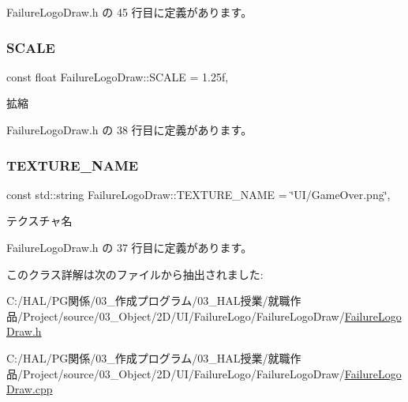  Failure\+Logo\+Draw.\+h の 45 行目に定義があります。

\mbox{\label{class_failure_logo_draw_a356d2f6f14682ad6f2e9a01ffdd587b0}} 
\subsubsection{\texorpdfstring{S\+C\+A\+LE}{SCALE}}
{\footnotesize\ttfamily const float Failure\+Logo\+Draw\+::\+S\+C\+A\+LE = 1.\+25f\hspace{0.3cm}{\ttfamily [static]}, {\ttfamily [private]}}



拡縮 



 Failure\+Logo\+Draw.\+h の 38 行目に定義があります。

\mbox{\label{class_failure_logo_draw_a287b81d9dcab4be17a88d9aff7c97a9a}} 
\subsubsection{\texorpdfstring{T\+E\+X\+T\+U\+R\+E\+\_\+\+N\+A\+ME}{TEXTURE\_NAME}}
{\footnotesize\ttfamily const std\+::string Failure\+Logo\+Draw\+::\+T\+E\+X\+T\+U\+R\+E\+\_\+\+N\+A\+ME = \char`\"{}UI/Game\+Over.\+png\char`\"{}\hspace{0.3cm}{\ttfamily [static]}, {\ttfamily [private]}}



テクスチャ名 



 Failure\+Logo\+Draw.\+h の 37 行目に定義があります。



このクラス詳解は次のファイルから抽出されました\+:\begin{DoxyCompactItemize}
\item 
C\+:/\+H\+A\+L/\+P\+G関係/03\+\_\+作成プログラム/03\+\_\+\+H\+A\+L授業/就職作品/\+Project/source/03\+\_\+\+Object/2\+D/\+U\+I/\+Failure\+Logo/\+Failure\+Logo\+Draw/\mbox{\hyperlink{_failure_logo_draw_8h}{Failure\+Logo\+Draw.\+h}}\item 
C\+:/\+H\+A\+L/\+P\+G関係/03\+\_\+作成プログラム/03\+\_\+\+H\+A\+L授業/就職作品/\+Project/source/03\+\_\+\+Object/2\+D/\+U\+I/\+Failure\+Logo/\+Failure\+Logo\+Draw/\mbox{\hyperlink{_failure_logo_draw_8cpp}{Failure\+Logo\+Draw.\+cpp}}\end{DoxyCompactItemize}
